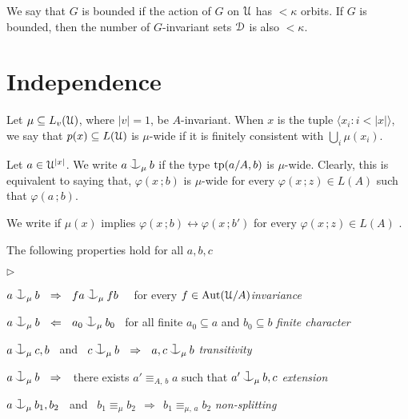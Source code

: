 \documentclass{amsproc}
\newcommand{\mylabel}[1]{{#1}\hfill}
\renewenvironment{itemize}
  {\begin{list}{$\triangleright$}{%
  \setlength{\parskip}{0mm}
  \setlength{\topsep}{.4\baselineskip}
  \setlength{\rightmargin}{0mm}
  \setlength{\listparindent}{0mm}
  \setlength{\itemindent}{0mm}
  \setlength{\labelwidth}{3ex}
  \setlength{\itemsep}{.2\baselineskip}
  \setlength{\parsep}{.2\baselineskip}
  \setlength{\partopsep}{0mm}
  \setlength{\labelsep}{1ex}
  \setlength{\leftmargin}{\labelwidth+\labelsep}
  \let\makelabel\mylabel}}{%
\end{list}}
\renewcommand*{\emph}[1]{%
   \smash{\tikz[baseline]\node[rectangle, fill=teal!25, rounded corners, inner xsep=0.5ex, inner ysep=0.2ex, anchor=base, minimum height = 2.7ex]{\strut #1};}}
\def\cnonfork{\mathbin{\raise1.8ex\rlap{\kern0.6ex\rule{0.6ex}{0.1ex}}\rlap{\kern1.1ex\rule{0.1ex}{1.9ex}}\raise-0.3ex\hbox{$\smile$} } }
\begin{document}
We say that $G$ is bounded if the action of $G$ on $\EuScript U$ has $<\kappa$ orbits.
If $G$ is bounded, then the number of $G$-invariant sets $\EuScript D$ is also $<\kappa$.

\section{Independence}

Let $\mu\subseteq L_v(\EuScript U)$, where $|v|=1$, be $A$-invariant.
When $x$ is the tuple $\langle x_i:i<|x|\rangle$, we say that $p(x)\subseteq L(\EuScript U)$ is $\mu$-wide if it is finitely consistent with $\bigcup_i\mu(x_i)$.

Let $a\in\EuScript U^{|x|}$.
We write $a\cnonfork_\mu b$ if the type ${\rm tp}(a/A,b)$ is $\mu$-wide. 
Clearly, this is equivalent to saying that,  $\varphi(x\,;b)$ is $\mu$-wide for every $\varphi(x\,;z)\in L(A)$ such that $\varphi(a\,;b)$.

We write\emph{$b\equiv_\mu b'$\/} if $\mu(x)$ implies $\varphi(x\,;b)\leftrightarrow\varphi(x\,;b')$ for every $\varphi(x\,;z)\in L(A)$
.

\begin{lemma}\label{lem_coheir_independence}
  The following properties hold for all $a,b,c$
  \begin{itemize}
  \item[1.] $a\cnonfork_\mu b\ \ \Rightarrow\ \ fa\cnonfork_\mu fb$ \ \ 
            for every $f\in{\rm Aut}(\EuScript U/A)$\hfill \textit{invariance}
  \item[2.] $a\cnonfork_\mu b\ \ \Leftarrow\ \  a_0\cnonfork_\mu b_0$
            \ for all finite $a_0\subseteq a$  and $b_0\subseteq b$ \hfill\textit{finite character}
  \item[3.] $a\cnonfork_\mu c,b$ \ and \ 
            $c\cnonfork_\mu b\ \ \Rightarrow\ \ a,c\cnonfork_\mu b$
            \hfill\hfill\hfill\textit{transitivity}
  \item[4.] $a\cnonfork_\mu b\ \ \Rightarrow\ \ $ 
            there exists $a'\equiv_{A,\,b}a$ such that 
            $a'\cnonfork_\mu b,c$
            \textit{extension}
  \item[5.] $a\cnonfork_\mu b_1,b_2$ \ and \ 
  $b_1\equiv_\mu b_2\ \ \Rightarrow\ \ b_1\equiv_{\mu,\,a}b_2$
            \hspace{\stretch{20}}\textit{non-splitting}
  \end{itemize}
\end{lemma}
\end{document}
